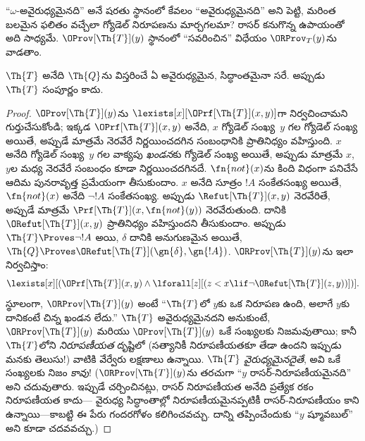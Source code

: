 \documentclass[../../../include/open-logic-section]{subfiles}
\begin{document}


``$\omega$-అవైరుధ్యమైనది'' అనే షరతు స్థానంలో కేవలం ``అవైరుధ్యమైనది'' అని
పెట్టి, మరింత బలమైన ఫలితం వచ్చేలా గ్యోడెల్ నిరూపణను మార్చగలమా?
రాసర్ కనుగొన్న ఉపాయంతో అది సాధ్యమే. $\OProv[\Th{T}](y)$ స్థానంలో
``సవరించిన''  విధేయం $\ORProv_T(y)$ను వాడతాం.

\begin{thm}
$\Th{T}$ అనేది $\Th{Q}$ను విస్తరించే ఏ అవైరుధ్యమైన,
 సిద్ధాంతమైనా సరే. అప్పుడు $\Th{T}$ సంపూర్ణం కాదు.
\end{thm}

\begin{proof}
$\OProv[\Th{T}](y)$ను $\lexists[x][\OPrf[\Th{T}](x,y)]$గా నిర్వచించామని
గుర్తుచేసుకోండి; ఇక్కడ $\OPrf[\Th{T}](x,y)$ అనేది, $x$ గ్యోడెల్ సంఖ్య~$y$
గల   గ్యోడెల్ సంఖ్య అయితే, అప్పుడే మాత్రమే
నెరవేరే నిర్ణయించదగిన సంబంధానికి ప్రాతినిధ్యం వహిస్తుంది. $x$ అనేది గ్యోడెల్
సంఖ్య~$y$ గల వాక్యపు \emph{ఖండన}కు గ్యోడెల్ సంఖ్య అయితే, అప్పుడు మాత్రమే
$x$, $y$ల మధ్య నెరవేరే సంబంధం కూడా నిర్ణయించదగినదే. $\fn{not}(x)$ను
కింది విధంగా పనిచేసే ఆదిమ పునరావృత్త ప్రమేయంగా తీసుకుందాం. $x$ అనేది
సూత్రం $!A$ సంకేతసంఖ్య అయితే, $\fn{not}(x)$ అనేది $\lnot !A$ సంకేతసంఖ్య. అప్పుడు
$\Refut[\Th{T}](x,y)$ నెరవేరితే, అప్పుడే మాత్రమే $\Prf[\Th{T}](x,\fn{not}(y))$ నెరవేరుతుంది.
దానికి $\ORefut[\Th{T}](x,y)$ ప్రాతినిధ్యం వహిస్తుందని తీసుకుందాం.
అప్పుడు $\Th{T} \Proves \lnot !A$ అయి, $\delta$ దానికి అనుగుణమైన
 అయితే, $\Th{Q} \Proves
\ORefut[\Th{T}](\gn{\delta},\gn{!A})$. $\ORProv[\Th{T}](y)$ను ఇలా
నిర్వచిస్తాం:
\[
\lexists[x][(\OPrf[\Th{T}](x,y) \land \lforall[z][(z < x \lif \lnot
  \ORefut[\Th{T}](z,y))])].
\]
స్థూలంగా, $\ORProv[\Th{T}](y)$ అంటే ``$\Th{T}$లో $y$కు ఒక నిరూపణ ఉంది,
అలాగే $y$కు దానికంటే చిన్న ఖండన లేదు.'' $\Th{T}$ అవైరుధ్యమైనదని
అనుకుంటే, $\ORProv[\Th{T}](y)$ మరియు $\OProv[\Th{T}](y)$ ఒకే సంఖ్యలకు
నిజమవుతాయి; కానీ $\Th{T}$లోని \emph{నిరూపణీయత} దృష్టిలో (సత్యానికీ
నిరూపణీయతకూ తేడా ఉందని ఇప్పుడు మనకు తెలుసు!) వాటికి వేర్వేరు లక్షణాలు
ఉన్నాయి. $\Th{T}$ \emph{వైరుధ్యమైనదైతే}, అవి ఒకే సంఖ్యలకు నిజం \emph{కావు}!{}
($\ORProv[\Th{T}](y)$ను తరచుగా ``$y$ రాసర్-నిరూపణీయమైనది'' అని చదువుతారు.
ఇప్పుడే చర్చించినట్లు, రాసర్ నిరూపణీయత అనేది ప్రత్యేక రకం నిరూపణీయత కాదు---
వైరుధ్య సిద్ధాంతాల్లో నిరూపణీయమైనప్పటికీ రాసర్-నిరూపణీయం కాని
 ఉన్నాయి---కాబట్టి ఈ పేరు గందరగోళం కలిగించవచ్చు. దాన్ని తప్పించేందుకు
``$y$ ష్మూవబుల్'' అని కూడా చదవవచ్చు.)


\end{proof}
\end{document}
